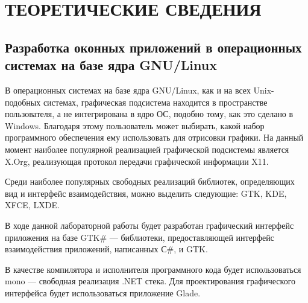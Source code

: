 \section{ТЕОРЕТИЧЕСКИЕ СВЕДЕНИЯ}

\subsection{Разработка оконных приложений в
  операционных системах на базе ядра GNU/Linux}

В операционных системах на базе ядра GNU/Linux, как и на всех Unix-подобных
системах, графическая подсистема находится в пространстве пользователя, 
а не интегрирована в ядро ОС, подобно тому, как это сделано в Windows.
Благодаря этому пользователь может выбирать, какой набор 
программного обеспечения ему использовать для отрисовки графики.
На данный момент наиболее популярной реализацией графической подсистемы является
X.Org, реализующая протокол передачи графической информации X11.

Среди наиболее популярных свободных реализаций библиотек, 
определяющих вид и интерфейс взаимодействия, можно выделить следующие:
GTK, KDE, XFCE, LXDE. 

В ходе данной лабораторной работы будет разработан графический интерфейс 
приложения на базе GTK\# --- библиотеки, предоставляющей интерфейс 
взаимодействия приложений, написанных С\#, и GTK.

В качестве компилятора и исполнителя программного кода
будет использоваться mono --- свободная реализация .NET стека.
Для проектирования графического интерфейса будет использоваться приложение
Glade.